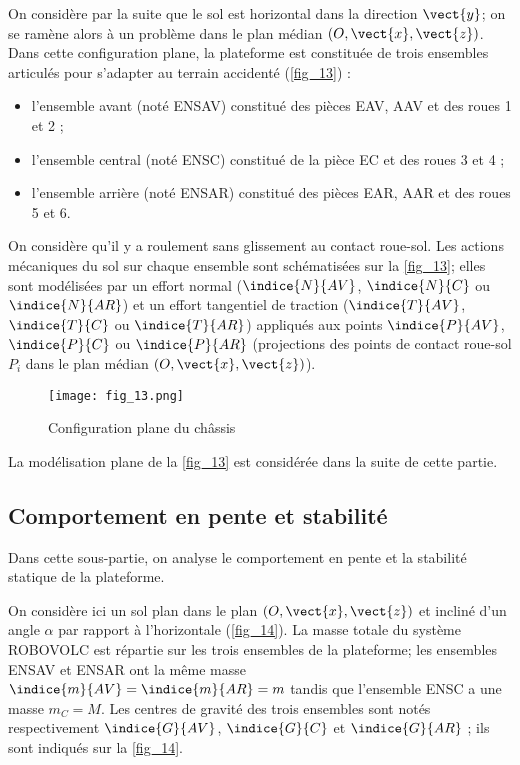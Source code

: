 \ifprof\else
On considère par la suite que le sol est horizontal dans la direction $\vect{y}$; on se ramène alors à un
problème dans le plan médian $\left(O,\vect{x},\vect{z}\right)$. Dans cette configuration plane, la plateforme est
constituée de trois ensembles articulés pour s'adapter au terrain accidenté (\autoref{fig_13}) :
\begin{itemize}
\item l'ensemble avant (noté ENSAV) constitué des pièces EAV, AAV et des roues 1 et 2 ;
\item l'ensemble central (noté ENSC) constitué de la pièce EC et des roues 3 et 4 ;
\item l'ensemble arrière (noté ENSAR) constitué des pièces EAR, AAR et des roues 5 et 6.
\end{itemize}

On considère qu'il y a roulement sans glissement au contact roue-sol. Les actions mécaniques du
sol sur chaque ensemble sont schématisées sur la \autoref{fig_13}; elles sont modélisées par un effort
normal ($\indice{N}{AV}$, $\indice{N}{C}$ ou $\indice{N}{AR}$) et un effort tangentiel de traction ($\indice{T}{AV}$, $\indice{T}{C}$ ou $\indice{T}{AR}$) appliqués aux
points $\indice{P}{AV}$, $\indice{P}{C}$ ou $\indice{P}{AR}$ (projections des points de contact roue-sol $P_i$ dans le plan médian $\left(O,\vect{x},\vect{z}\right)$).

\begin{figure}[H]
\centering
\texttt{[image: fig\_13.png]}
\caption{Configuration plane du châssis\label{fig_13}}
\end{figure}
\fi


\ifprof\else
La modélisation plane de la \autoref{fig_13} est considérée dans la suite de cette partie.
\fi

\subsection{Comportement en pente et stabilité}
\begin{obj}
Dans cette sous-partie, on analyse le comportement en pente et la stabilité statique de la
plateforme.
\end{obj}
\ifprof\else
On considère ici un sol plan dans le plan $\left(O,\vect{x},\vect{z}\right)$ et incliné d'un angle $\alpha$ par rapport à
l'horizontale (\autoref{fig_14}). La masse totale du système ROBOVOLC est répartie sur les trois
ensembles de la plateforme; les ensembles ENSAV et ENSAR ont la même masse
$\indice{m}{AV}=\indice{m}{AR}=m$ tandis que l'ensemble ENSC a une masse $m_C=M$. Les centres de gravité des
trois ensembles sont notés respectivement $\indice{G}{AV}$, $\indice{G}{C}$ et $\indice{G}{AR}$ ; ils sont indiqués sur la \autoref{fig_14}.


